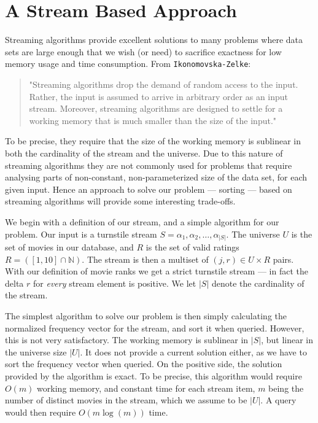 \section*{A Stream Based Approach}
Streaming algorithms provide excellent solutions to many problems where data
sets are large enough that we wish (or need) to sacrifice exactness for low
memory usage and time consumption.
From \texttt{Ikonomovska\--Zelke}:
\begin{quote}
"Streaming algorithms drop the demand of random access to the input. Rather, the input
is assumed to arrive in arbitrary order as an input stream. Moreover, streaming algorithms
are designed to settle for a working memory that is much smaller than the size
of the input."
\end{quote}
To be precise, they require that the size of the working memory is sublinear in both the cardinality of the stream and the universe.
Due to this nature of streaming algorithms they are not commonly used for
problems that require analysing parts of non-constant, non-parameterized size
of the data set, for each given input. Hence an approach to
solve our problem --- sorting --- based on streaming algorithms will provide some interesting
trade-offs.

We begin with a definition of our stream, and a simple algorithm for our
problem. Our input is a turnstile stream $S = \alpha_1,
\alpha_2,\ldots,\alpha_{|S|}$. The universe
$U$ is the set of movies in our database, and $R$ is the set of valid ratings 
$R = \left(\left[1,10\right]\cap \mathbb{N}\right)$. The stream is then a
multiset of $(j,r) \in U \times R$ pairs.
With our definition of movie ranks we get a strict turnstile stream ---
in fact the delta $r$ for \textit{every} stream element is positive.
We let $|S|$ denote the cardinality of the stream.

The simplest algorithm to solve our problem is then simply calculating the
normalized frequency vector for the stream, and sort it when queried.
However, this is not very satisfactory. The working memory is
sublinear in $|S|$, but linear in the universe size $|U|$. It
does not provide a current solution either, as we have to sort the frequency
vector when queried. On the positive side, the solution provided by the
algorithm is exact. To be precise, this algorithm would require $O(m)$ working
memory, and constant time for each stream item, $m$ being the number of distinct movies
in the stream, which we assume to be $|U|$. A query would then
require $O(m \log(m))$ time.


